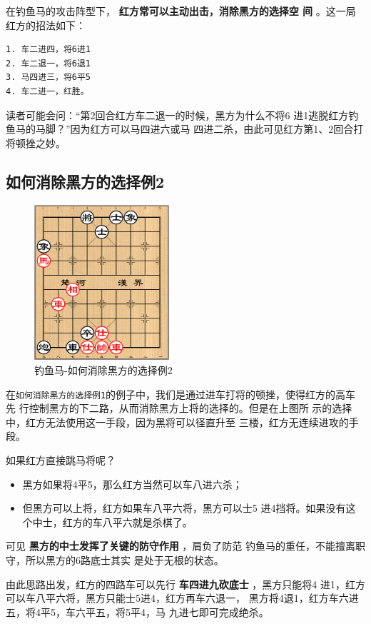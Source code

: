 \documentclass[a5paper,twoside]{book}
\begin{document}
在钓鱼马的攻击阵型下， \textbf{红方常可以主动出击，消除黑方的选择空
间} 。这一局红方的招法如下：

\begin{verbatim}
1. 车二进四，将6进1
2. 车二退一，将6退1
3. 马四进三，将6平5
4. 车二进一，红胜。
\end{verbatim}

读者可能会问：“第2回合红方车二退一的时候，黑方为什么不将6
进1逃脱红方钓鱼马的马脚？”因为红方可以马四进六或马
四进二杀，由此可见红方第1、2回合打将顿挫之妙。

\subsection{如何消除黑方的选择例2}
\label{sec-3-3-2}
\begin{figure}[H]
\centering
\includegraphics[width=5cm]{pic/钓鱼马-如何消除黑方的选择又一例.png}
\caption{钓鱼马-如何消除黑方的选择例2}
\end{figure}


在\texttt{如何消除黑方的选择例1}的例子中，我们是通过进车打将的顿挫，使得红方的高车先
行控制黑方的下二路，从而消除黑方上将的选择的。但是在上图所
示的选择中，红方无法使用这一手段，因为黑将可以径直升至
三楼，红方无连续进攻的手段。

如果红方直接跳马将呢？
\begin{itemize}
\item 黑方如果将4平5，那么红方当然可以车八进六杀；
\item 但黑方可以上将，红方如果车八平六将，黑方可以士5
进4挡将。如果没有这个中士，红方的车八平六就是杀棋了。
\end{itemize}

可见 \textbf{黑方的中士发挥了关键的防守作用} ，肩负了防范
钓鱼马的重任，不能擅离职守，所以黑方的6路底士其实
是处于无根的状态。

由此思路出发，红方的四路车可以先行 \textbf{车四进九砍底士} ，黑方只能将4
进1，红方可以车八平六将，黑方只能士5进4，红方再车六退一，
黑方将4退1，红方车六进五，将4平5，车六平五，将5平4，马
九进七即可完成绝杀。
\end{document}
